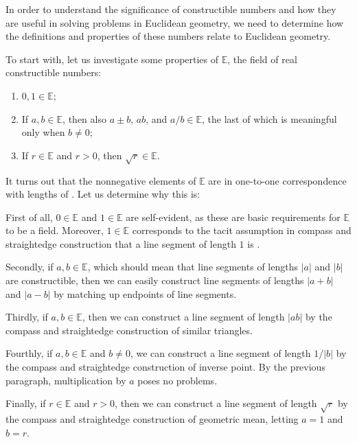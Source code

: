 \documentclass[12pt]{article}
\begin{document}

In order to understand the significance of constructible numbers and how they are useful in solving problems in Euclidean geometry, we need to determine how the definitions and properties of these numbers relate to Euclidean geometry.

To start with, let us investigate some properties of $\mathbb{E}$, the field of real constructible numbers:

\begin{enumerate}
\item $0,1 \in \mathbb{E}$;
\item If $a,b\in\mathbb{E}$, then also $a\pm b$, $ab$, and $a/b\in\mathbb{E}$, the last of which is meaningful only when $b\not=0$;
\item If $r\in\mathbb{E}$ and $r>0$, then $\sqrt{r}\in\mathbb{E}$.
\end{enumerate}

It turns out that the nonnegative elements of $\mathbb{E}$ are in one-to-one correspondence with lengths of .  Let us determine why this is:

First of all, $0 \in \mathbb{E}$ and $1 \in \mathbb{E}$ are self-evident, as these are basic requirements for $\mathbb{E}$ to be a field.  Moreover, $1 \in \mathbb{E}$ corresponds to the tacit assumption in compass and straightedge construction that a line segment of length $1$ is .

Secondly, if $a,b\in\mathbb{E}$, which should mean that line segments of lengths $|a|$ and $|b|$ are constructible, then we can easily construct line segments of lengths $|a+b|$ and $|a-b|$ by matching up endpoints of line segments.

Thirdly, if $a,b\in\mathbb{E}$, then we can construct a line segment of length $|ab|$ by the compass and straightedge construction of similar triangles.

Fourthly, if $a,b\in\mathbb{E}$ and $b \neq 0$, we can construct a line segment of length $1/|b|$ by the compass and straightedge construction of inverse point.  By the previous paragraph, multiplication by $a$ poses no problems.

Finally, if $r\in\mathbb{E}$ and $r>0$, then we can construct a line segment of length $\sqrt{r}$ by the compass and straightedge construction of geometric mean, letting $a=1$ and $b=r$.
\end{document}
